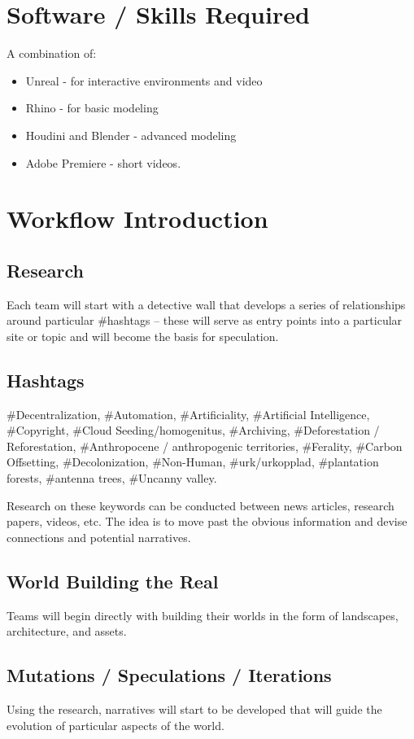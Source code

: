 \documentclass{article}
\begin{document}
\section{Software / Skills Required}
A combination of:
\begin{itemize}
    \item Unreal - for interactive environments and video
    \item Rhino - for basic modeling
    \item Houdini and Blender - advanced modeling
    \item Adobe Premiere - short videos.
\end{itemize}

\section{Workflow Introduction}
\subsection{Research}
Each team will start with a detective wall that develops a series of relationships around particular \#hashtags – these will serve as entry points into a particular site or topic and will become the basis for speculation.

\subsection{Hashtags}
\#Decentralization, \#Automation, \#Artificiality, \#Artificial Intelligence, \#Copyright, \#Cloud Seeding/homogenitus, \#Archiving, \#Deforestation / Reforestation, \#Anthropocene / anthropogenic territories, \#Ferality, \#Carbon Offsetting, \#Decolonization, \#Non-Human, \#urk/urkopplad, \#plantation forests, \#antenna trees, \#Uncanny valley.
\newline \newline

Research on these keywords can be conducted between news articles, research papers, videos, etc. The idea is to move past the obvious information and devise connections and potential narratives.

\subsection{World Building the Real}
Teams will begin directly with building their worlds in the form of landscapes, architecture, and assets.

\subsection{Mutations / Speculations / Iterations}
Using the research, narratives will start to be developed that will guide the evolution of particular aspects of the world.
\end{document}
